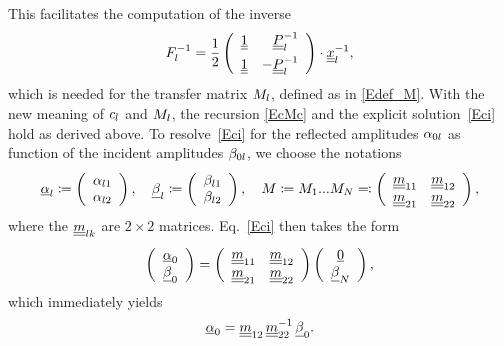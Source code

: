 This facilitates the computation of the inverse
\begin{equation}
  F_l^{-1}
    = \frac{1}{2}
    \left(\begin{array}{cc}\underline{\underline{1}}&\hphantom{-}\underline{\underline{P}}_l^{-1}\\[1.2ex]
      \underline{\underline{1}} &-\underline{\underline{P}}_l^{-1}\end{array}\right)
      \cdot\underline{\underline{x}}_l^{-1},
\end{equation}
which is needed for the transfer matrix $M_l$,
defined as in \cref{Edef_M}.
With the new meaning of $c_l$ and $M_l$,
the recursion \cref{EcMc} and the explicit solution~\cref{Eci}
hold as derived above.
To resolve~\cref{Eci} for the reflected amplitudes $\alpha_{0l}$
as function of the incident amplitudes $\beta_{0l}$,
we choose the notations
\begin{equation}
  \u\alpha_\il
  \coloneqq \left(\begin{array}{c}\alpha_{\il1}\\\alpha_{\il2}\end{array}\right),\quad
  \u\beta_\il
  \coloneqq \left(\begin{array}{c}\beta_{\il1}\\\beta_{\il2}\end{array}\right),\quad
  M\coloneqq M_1 ... M_N %
  \eqqcolon \left(\begin{array}{cc}\uu m_{11}&\uu m_{12}\\
                           \uu m_{21}&\uu m_{22}\end{array}\right),
\end{equation}
where the $\underline{\underline{m}}_{l k}$ are $2\times2$ matrices.
Eq.~\cref{Eci} then takes the form
\begin{equation}
  \left(\begin{array}{c}\underline{\alpha}_{0}\\\underline{\beta}_{0}\end{array}\right)
  =
  \left(\begin{array}{cc}\underline{\underline{m}}_{11}&\underline{\underline{m}}_{12}\\
    \underline{\underline{m}}_{21}&\underline{\underline{m}}_{22}\end{array}\right)
  \left(\begin{array}{c}\underline{0}\\\underline{\beta}_{N}\end{array}\right),
\end{equation}
which immediately yields
\begin{equation}
  \underline{\alpha}_0 = \underline{\underline{m}}_{12}\,\underline{\underline{m}}_{22}^{-1}\,\underline{\beta}_0.
\end{equation}

